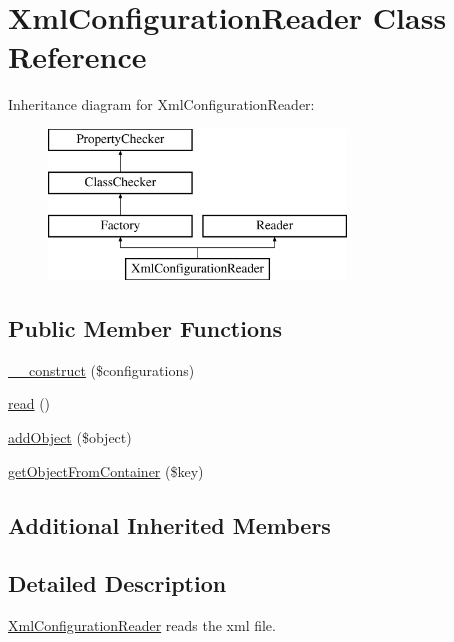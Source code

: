 \hypertarget{class_xml_configuration_reader}{\section{Xml\-Configuration\-Reader Class Reference}
\label{class_xml_configuration_reader}
}
Inheritance diagram for Xml\-Configuration\-Reader\-:\begin{figure}[H]
\begin{center}
\leavevmode
\includegraphics[height=4.000000cm]{class_xml_configuration_reader}
\end{center}
\end{figure}
\subsection*{Public Member Functions}
\begin{DoxyCompactItemize}
\item 
\hyperlink{class_xml_configuration_reader_af44a931aab63dc6542b103bafe9d9c87}{\-\_\-\-\_\-construct} (\$configurations)
\item 
\hyperlink{class_xml_configuration_reader_a64571309bfb3238c65fd3c2898f92440}{read} ()
\item 
\hyperlink{class_xml_configuration_reader_ab10a1fa095c486bea43aadd057baaf78}{add\-Object} (\$object)
\item 
\hyperlink{class_xml_configuration_reader_af6fa42b05b84795a316a1ebf2a154d6d}{get\-Object\-From\-Container} (\$key)
\end{DoxyCompactItemize}
\subsection*{Additional Inherited Members}


\subsection{Detailed Description}
\hyperlink{class_xml_configuration_reader}{Xml\-Configuration\-Reader} reads the xml file.

